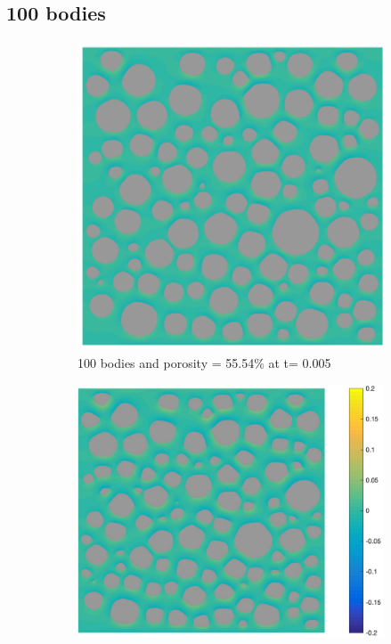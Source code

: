 \documentclass[preprint, 10pt]{elsarticle}
\begin{document}
\subsection{100 bodies}
\begin{figure}[H]
 \begin{subfigure}[b]{0.5\textwidth}
\includegraphics*[width =0.9\linewidth]{./figs/100b_50}
\caption{100 bodies and porosity = 55.54\% at t= 0.005}
\end{subfigure}%
\begin{subfigure}[b]{0.5\textwidth}
\includegraphics*[width =1.1\linewidth]{./figs/100b_100}

\end{subfigure}
\end{figure}
\end{document}
